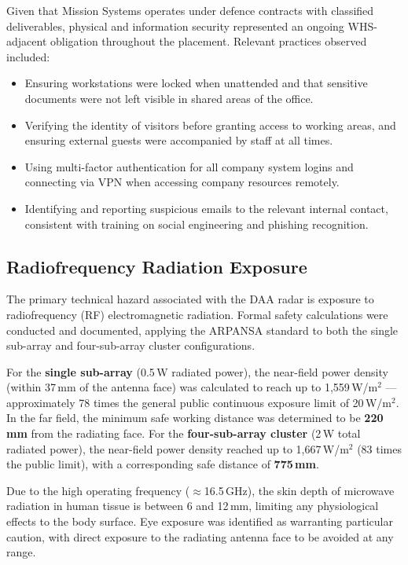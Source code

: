 Given that Mission Systems operates under defence contracts with classified deliverables,
physical and information security represented an ongoing WHS-adjacent obligation throughout
the placement. Relevant practices observed included:
 
\begin{itemize}
    \item Ensuring workstations were locked when unattended and that sensitive documents were
    not left visible in shared areas of the office.
    \item Verifying the identity of visitors before granting access to working areas, and
    ensuring external guests were accompanied by staff at all times.
    \item Using multi-factor authentication for all company system logins and connecting via
    VPN when accessing company resources remotely.
    \item Identifying and reporting suspicious emails to the relevant internal contact,
    consistent with training on social engineering and phishing recognition.
\end{itemize}
 
\subsection*{Radiofrequency Radiation Exposure}
 
The primary technical hazard associated with the DAA radar is exposure to
radiofrequency (RF) electromagnetic radiation. Formal safety calculations were conducted and
documented, applying the ARPANSA standard to both the single sub-array and four-sub-array
cluster configurations.
 
For the \textbf{single sub-array} (0.5\,W radiated power), the near-field power density
(within 37\,mm of the antenna face) was calculated to reach up to 1,559\,W/m$^2$ ---
approximately 78 times the general public continuous exposure limit of 20\,W/m$^2$. In the
far field, the minimum safe working distance was determined to be \textbf{220\,mm} from the
radiating face. For the \textbf{four-sub-array cluster} (2\,W total radiated power), the
near-field power density reached up to 1,667\,W/m$^2$ (83 times the public limit), with a
corresponding safe distance of \textbf{775\,mm}.
 
Due to the high operating frequency ($\approx$16.5\,GHz), the skin depth of microwave
radiation in human tissue is between 6 and 12\,mm, limiting any physiological effects to
the body surface. Eye exposure was identified as warranting particular caution, with direct
exposure to the radiating antenna face to be avoided at any range.
 
